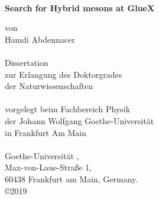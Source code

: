 
\begin{titlepage}
\thispagestyle{empty}
\setlength{\unitlength}{1mm}

\vspace{2cm}
\begin{center}
\mbox{}\\[20mm]
{\huge\bf Search for Hybrid mesons at GlueX}\par
\vspace{2cm}
{von}
\vspace{5mm}\\
{\LARGE Hamdi Abdennacer}\\
\mbox{}\\[2cm]
{\Large Dissertation\\
zur Erlangung des Doktorgrades\\
der Naturwissenschaften}\\
\mbox{}\\[2cm]
{\large vorgelegt beim Fachbereich Physik\\
der Johann Wolfgang Goethe-Universit\"at \\
in Frankfurt Am Main}\\
\mbox{}\\[2cm]
{Goethe-Universit\"at , \\
Max-von-Laue-Straße 1, \\
60438 Frankfurt am Main, Germany.}\\
\vspace{3mm}
{\copyright 2019}
\end{center}

\newpage
\thispagestyle{empty}
\end{titlepage}